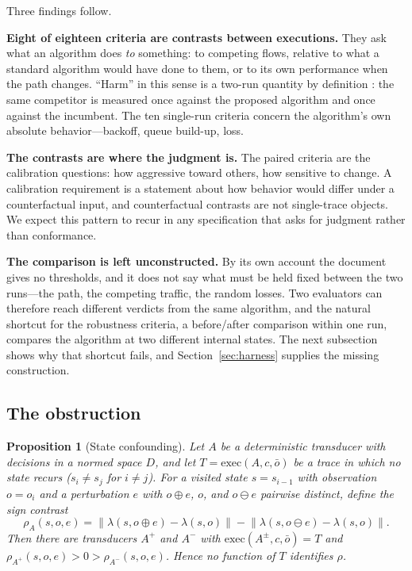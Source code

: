 \documentclass[conference]{IEEEtran}
\newtheorem{proposition}{Proposition}
\newcommand{\exec}{\mathrm{exec}}
\begin{document}
	Three findings follow.
	
	\textbf{Eight of eighteen criteria are contrasts between executions.}
	They ask what an algorithm does \emph{to} something: to competing flows,
	relative to what a standard algorithm would have done to them, or to its
	own performance when the path changes. ``Harm'' in this sense is a
	two-run quantity by definition \cite{ware2019}: the same competitor is
	measured once against the proposed algorithm and once against the
	incumbent. The ten single-run criteria concern the algorithm's own
	absolute behavior---backoff, queue build-up, loss.
	
	\textbf{The contrasts are where the judgment is.} The paired criteria
	are the calibration questions: how aggressive toward others, how
	sensitive to change. A calibration requirement is a statement about how
	behavior would differ under a counterfactual input, and counterfactual
	contrasts are not single-trace objects. We expect this pattern to recur
	in any specification that asks for judgment rather than conformance.
	
	\textbf{The comparison is left unconstructed.} By its own account the
	document gives no thresholds, and it does not say what must be held
	fixed between the two runs---the path, the competing traffic, the random
	losses. Two evaluators can therefore reach different verdicts from the
	same algorithm, and the natural shortcut for the robustness criteria, a
	before/after comparison within one run, compares the algorithm at two
	different internal states. The next subsection shows why that shortcut
	fails, and Section~\ref{sec:harness} supplies the missing construction.
	
	\subsection{The obstruction}
	
	\begin{proposition}[State confounding]
		\label{prop:confound}
		Let $A$ be a deterministic transducer with decisions in a normed space
		$D$, and let $T = \exec(A, c, \bar{o})$ be a trace in which no state
		recurs ($s_i \neq s_j$ for $i \neq j$). For a visited state $s = s_{i-1}$
		with observation $o = o_i$ and a perturbation $e$ with
		$o \oplus e$, $o$, and $o \ominus e$ pairwise distinct, define the sign contrast
		\[
		\rho_A(s, o, e) = \big\| \lambda(s, o \oplus e) - \lambda(s, o) \big\|
		- \big\| \lambda(s, o \ominus e) - \lambda(s, o) \big\| .
		\]
		Then there are transducers $A^{+}$ and $A^{-}$ with
		$\exec(A^{\pm}, c, \bar{o}) = T$ and
		$\rho_{A^{+}}(s,o,e) > 0 > \rho_{A^{-}}(s,o,e)$. Hence no function of $T$
		identifies $\rho$.
	\end{proposition}
	
\end{document}
